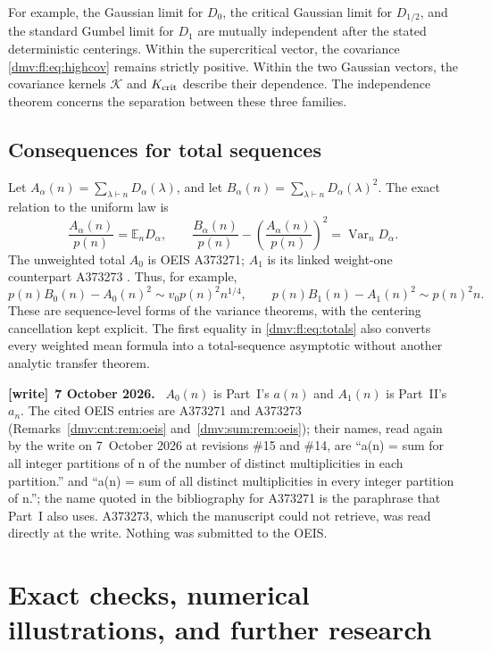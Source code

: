 \documentclass[11pt,letterpaper]{article}
\numberwithin{equation}{section}
\theoremstyle{definition}\newtheorem{definition}[theorem]{Definition}
\theoremstyle{remark}\newtheorem{remark}[theorem]{Remark}
\newcommand{\E}{\mathbb E}
\newenvironment{writenote}[1][]{\par\smallskip\begingroup\small
 \noindent\textbf{[write]}\if\relax\detokenize{#1}\relax\else~\textbf{#1.}\fi\ }%
 {\par\endgroup\smallskip}
\DeclareMathOperator{\Var}{Var}
\begin{document}
For example, the Gaussian limit for $D_0$, the critical Gaussian
limit for $D_{1/2}$, and the standard Gumbel limit for $D_1$ are
mutually independent after the stated deterministic centerings.
Within the supercritical vector, the covariance
\eqref{dmv:fl:eq:highcov} remains strictly positive. Within the two
Gaussian vectors, the covariance kernels $\mathcal K$ and
$K_{\rm crit}$ describe their dependence. The independence theorem
concerns the separation between these three families.

\subsection{Consequences for total sequences}
Let $A_\alpha(n)=\sum_{\lambda\vdash n}D_\alpha(\lambda)$, and let
$B_\alpha(n)=\sum_{\lambda\vdash n}D_\alpha(\lambda)^2$.
The exact relation to the uniform law is
\begin{equation}\label{dmv:fl:eq:totals}
 \frac{A_\alpha(n)}{p(n)}=\E_nD_\alpha,\qquad
 \frac{B_\alpha(n)}{p(n)}
       -\left(\frac{A_\alpha(n)}{p(n)}\right)^2
 =\Var_nD_\alpha.
\end{equation}
The unweighted total $A_0$ is OEIS A373271; $A_1$ is its linked
weight-one counterpart A373273 \cite{oeisA373271,oeisA373273}. Thus, for example,
\[
 p(n)B_0(n)-A_0(n)^2\sim v_0p(n)^2n^{1/4},\qquad
 p(n)B_1(n)-A_1(n)^2\sim p(n)^2n.
\]
These are sequence-level forms of the variance theorems, with the
centering cancellation kept explicit. The first equality in
\eqref{dmv:fl:eq:totals} also converts every weighted mean formula into a
total-sequence asymptotic without another analytic transfer theorem.
\begin{writenote}[7 October 2026]
$A_0(n)$ is Part~I's $a(n)$ and $A_1(n)$ is Part~II's $a_n$. The cited
OEIS entries are A373271 and A373273 (Remarks~\ref{dmv:cnt:rem:oeis}
and~\ref{dmv:sum:rem:oeis}); their names, read again by the write on
7~October 2026 at revisions \#15 and \#14, are ``a(n) = sum for all
integer partitions of n of the number of distinct multiplicities in each
partition.'' and ``a(n) = sum of all distinct multiplicities in every
integer partition of n.''; the name quoted in the bibliography for
A373271 is the paraphrase that Part~I also uses. A373273, which the
manuscript could not retrieve, was read directly at the write. Nothing was
submitted to the OEIS.
\end{writenote}
\section{Exact checks, numerical illustrations, and further research}\label{dmv:fl:sec:verification}
\end{document}
